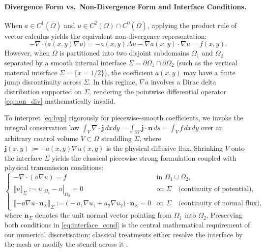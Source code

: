 \documentclass[11pt,a4paper]{article}
\theoremstyle{definition}
\theoremstyle{remark}
\begin{document}
\paragraph{Divergence Form vs.\ Non-Divergence Form and Interface Conditions.}
When $a \in C^1(\bar{\Omega})$ and $u \in C^2(\Omega) \cap C^0(\bar{\Omega})$, applying the product rule of vector calculus yields the equivalent non-divergence representation:
\begin{equation}
    -\nabla\cdot\bigl(a(x,y)\nabla u\bigr) = -a(x,y)\Delta u - \nabla a(x,y)\cdot\nabla u = f(x,y).
    \label{eq:non_div}
\end{equation}
However, when $\Omega$ is partitioned into two disjoint subdomains $\Omega_1$ and $\Omega_2$ separated by a smooth internal interface $\Sigma = \partial\Omega_1 \cap \partial\Omega_2$ (such as the vertical material interface $\Sigma = \{x = 1/2\}$), the coefficient $a(x,y)$ may have a finite jump discontinuity across $\Sigma$. In this regime, $\nabla a$ involves a Dirac delta distribution supported on $\Sigma$, rendering the pointwise differential operator \eqref{eq:non_div} mathematically invalid. 

To interpret \eqref{eq:bvp} rigorously for piecewise-smooth coefficients, we invoke the integral conservation law $\int_V \nabla\cdot\bm{j}\,dxdy = \int_{\partial V} \bm{j}\cdot\bm{n}\,ds = \int_V f\,dxdy$ over an arbitrary control volume $V \subset \Omega$ straddling $\Sigma$, where $\bm{j}(x,y) := -a(x,y)\nabla u(x,y)$ is the physical diffusive flux. Shrinking $V$ onto the interface $\Sigma$ yields the classical piecewise strong formulation coupled with physical transmission conditions:
\begin{equation}
    \begin{cases}
        -\nabla\cdot(a\nabla u) = f & \text{in } \Omega_1 \cup \Omega_2, \\[1mm]
        \llbracket u \rrbracket_\Sigma := u|_{\Omega_1} - u|_{\Omega_2} = 0 & \text{on } \Sigma \quad \text{(continuity of potential)}, \\[1mm]
        \llbracket -a\nabla u \cdot \bm{n}_\Sigma \rrbracket_\Sigma := \bigl(-a_1\nabla u_1 + a_2\nabla u_2\bigr)\cdot\bm{n}_\Sigma = 0 & \text{on } \Sigma \quad \text{(continuity of normal flux)},
    \end{cases}
    \label{eq:interface_cond}
\end{equation}
where $\bm{n}_\Sigma$ denotes the unit normal vector pointing from $\Omega_1$ into $\Omega_2$. Preserving both conditions in \eqref{eq:interface_cond} is the central mathematical requirement of our numerical discretisation; classical treatments either resolve the interface by the mesh or modify the stencil across it \cite{leveque1994imm}.
\end{document}
